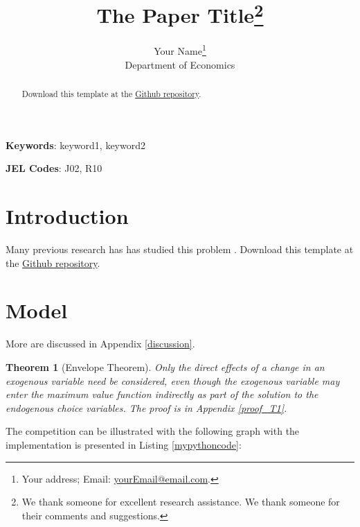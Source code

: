 \documentclass[11pt, letterpaper]{article}
\title{The Paper Title\thanks{We thank someone for excellent research assistance. We thank someone for their comments and suggestions.}}
\author{Your Name\thanks{Your address; Email: \href{mailto:yourEmail@email.com}{yourEmail@email.com}.}\\
Department of Economics}
\date{\the\year{}}
\newtheorem{theorem}{Theorem}
\begin{document}
\maketitle
\vspace*{1cm}

\doublespacing

\begin{abstract}
  \lipsum[3] Download this template at the \href{https://github.com/howardhsumail/Paper-LaTeX-Template.git}{Github repository}.
\end{abstract}
\vspace*{2cm}

\textbf{Keywords}: keyword1, keyword2

\textbf{JEL Codes}: J02, R10
\clearpage

\section{Introduction}
\lipsum[4-5] Many previous research has has studied this problem \citep{Lee2018, DS2018}. Download this template at the \href{https://github.com/howardhsumail/Paper-LaTeX-Template.git}{Github repository}.

\section{Model}
\lipsum[105-106] More are discussed in Appendix \ref{discussion}.

\begin{theorem}[Envelope Theorem]
  Only the direct effects of a change in an exogenous variable need be considered, even though the exogenous variable may enter the maximum value function indirectly as part of the solution to the endogenous choice variables. The proof is in Appendix \ref{proof_T1}.
\end{theorem}

The {\color{mycolor}competition} can be illustrated with the following graph with the implementation is presented in Listing \ref{mypythoncode}:
\end{document}

